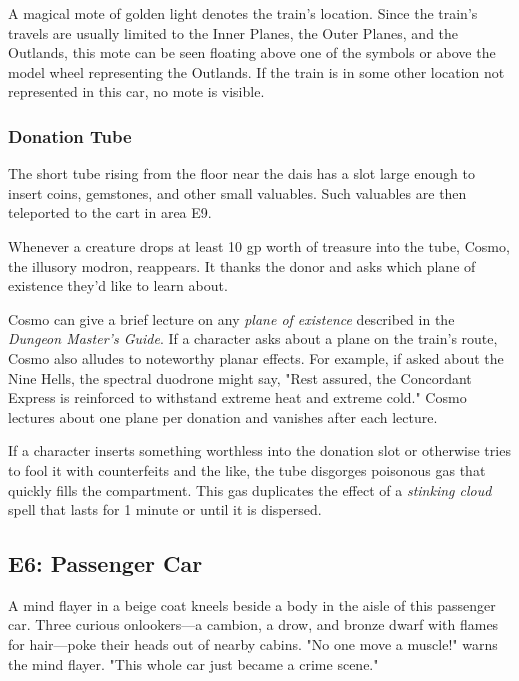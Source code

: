 \documentclass[10pt,a4paper,twoside,bg=print,twocolumn,openany,nodeprecatedcode]{dndbook}
\begin{document}
A magical mote of golden light denotes the train's location. Since the train's travels are usually limited to the Inner Planes, the Outer Planes, and the Outlands, this mote can be seen floating above one of the symbols or above the model wheel representing the Outlands. If the train is in some other location not represented in this car, no mote is visible.

\subsubsection{Donation Tube}
The short tube rising from the floor near the dais has a slot large enough to insert coins, gemstones, and other small valuables. Such valuables are then teleported to the cart in area E9.

Whenever a creature drops at least 10 gp worth of treasure into the tube, Cosmo, the illusory modron, reappears. It thanks the donor and asks which plane of existence they'd like to learn about.

Cosmo can give a brief lecture on any \textit{plane of existence} described in the \textit{Dungeon Master's Guide}. If a character asks about a plane on the train's route, Cosmo also alludes to noteworthy planar effects. For example, if asked about the Nine Hells, the spectral duodrone might say, "Rest assured, the Concordant Express is reinforced to withstand extreme heat and extreme cold." Cosmo lectures about one plane per donation and vanishes after each lecture.

If a character inserts something worthless into the donation slot or otherwise tries to fool it with counterfeits and the like, the tube disgorges poisonous gas that quickly fills the compartment. This gas duplicates the effect of a \textit{stinking cloud} spell that lasts for 1 minute or until it is dispersed.

\subsection{E6: Passenger Car}
\begin{DndReadAloud}{}
A mind flayer in a beige coat kneels beside a body in the aisle of this passenger car. Three curious onlookers—a cambion, a drow, and bronze dwarf with flames for hair—poke their heads out of nearby cabins. "No one move a muscle!" warns the mind flayer. "This whole car just became a crime scene."

\end{DndReadAloud}
\end{document}
